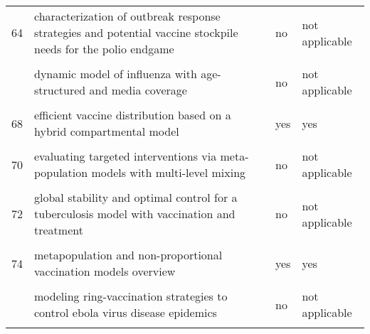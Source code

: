 \documentclass[
]{article}
\begin{document}
\begin{landscape}
\begin{longtable}{l>{\raggedright\arraybackslash}p{9cm}ll}
64 & characterization of outbreak response strategies and potential vaccine stockpile needs for the polio endgame & no & not applicable\\
\cellcolor{gray!6}{65} & \cellcolor{gray!6}{designing public health policies to mitigate the adverse consequences of rural-urban migration via meta-population modeling} & \cellcolor{gray!6}{no} & \cellcolor{gray!6}{not applicable}\\
\addlinespace
66 & dynamic model of influenza with age-structured and media coverage & no & not applicable\\
\cellcolor{gray!6}{67} & \cellcolor{gray!6}{economic evaluation of individual school closure strategies: the hong kong 2009 h1n1 pandemic} & \cellcolor{gray!6}{yes} & \cellcolor{gray!6}{yes}\\
68 & efficient vaccine distribution based on a hybrid compartmental model & yes & yes\\
\cellcolor{gray!6}{69} & \cellcolor{gray!6}{epidemiological evaluation of different fmd control strategies in two selected regions in austria} & \cellcolor{gray!6}{no} & \cellcolor{gray!6}{not applicable}\\
70 & evaluating targeted interventions via meta-population models with multi-level mixing & no & not applicable\\
\addlinespace
\cellcolor{gray!6}{71} & \cellcolor{gray!6}{evaluation of outbreak response immunization in the control of pertussis using agent-based modeling} & \cellcolor{gray!6}{yes} & \cellcolor{gray!6}{yes}\\
72 & global stability and optimal control for a tuberculosis model with vaccination and treatment & no & not applicable\\
\cellcolor{gray!6}{73} & \cellcolor{gray!6}{impact on epidemic measles of vaccination campaigns triggered by disease outbreaks or serosurveys: a modeling study} & \cellcolor{gray!6}{yes} & \cellcolor{gray!6}{yes}\\
74 & metapopulation and non-proportional vaccination models overview & yes & yes\\
\cellcolor{gray!6}{75} & \cellcolor{gray!6}{model-based comprehensive analysis of school closure policies for mitigating influenza epidemics and pandemics} & \cellcolor{gray!6}{yes} & \cellcolor{gray!6}{no}\\
\addlinespace
76 & modeling ring-vaccination strategies to control ebola virus disease epidemics & no & not applicable\\
\cellcolor{gray!6}{77} & \cellcolor{gray!6}{modeling the effect of public health resources and alerting on the dynamics of pertussis spread*} & \cellcolor{gray!6}{yes} & \cellcolor{gray!6}{yes}\\

\end{longtable}
\end{landscape}
\end{document}
